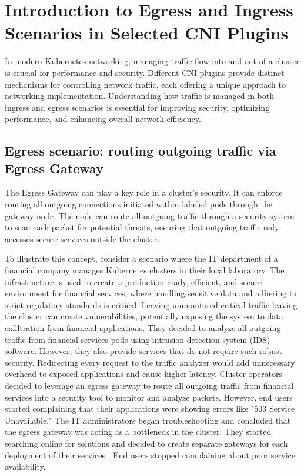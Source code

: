 \chapter{Introduction to Egress and Ingress Scenarios in Selected CNI Plugins}
\label{cha:introScenarios}
In modern Kubernetes networking, managing traffic flow into and out of a cluster is crucial for performance and security. Different CNI plugins provide distinct mechanisms for controlling network traffic, each offering a unique approach to networking implementation. Understanding how traffic is managed in both ingress and egress scenarios is essential for improving security, optimizing performance, and enhancing overall network efficiency.

\section{Egress scenario: routing outgoing traffic via Egress Gateway}
\label{sec:egress}

The Egress Gateway can play a key role in a cluster's security. It can enforce routing all outgoing connections initiated within labeled pods through the gateway node. The node can route all outgoing traffic through a security system to scan each packet for potential threats, ensuring that outgoing traffic only accesses secure services outside the cluster.

To illustrate this concept, consider a scenario where the IT department of a financial company manages Kubernetes clusters in their local laboratory. The infrastructure is used to create a production-ready, efficient, and secure environment for financial services, where handling sensitive data and adhering to strict regulatory standards is critical. Leaving unmonitored critical traffic leaving the cluster can create vulnerabilities, potentially exposing the system to data exfiltration from financial applications. They decided to analyze all outgoing traffic from financial services pods using intrusion detection system (IDS) software. However, they also provide services that do not require such robust security. Redirecting every request to the traffic analyzer would add unnecessary overhead to exposed applications and cause higher latency. Cluster operators decided to leverage an egress gateway to route all outgoing traffic from financial services into a security tool to monitor and analyze packets. However, end users started complaining that their applications were showing errors like "503 Service Unavailable." The IT administrators began troubleshooting and concluded that the egress gateway was acting as a bottleneck in the cluster. They started searching online for solutions and decided to create separate gateways for each deployment of their services \cite{CalicoEgressDeploy}. End users stopped complaining about poor service availability.

